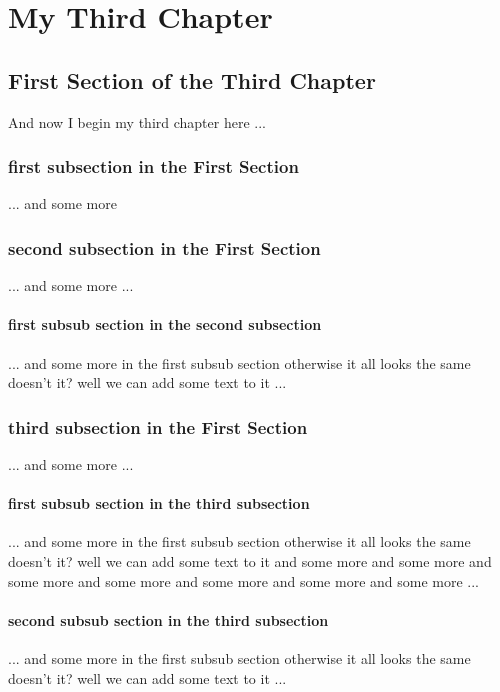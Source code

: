 \chapter{My Third Chapter}
\ifpdf
    \graphicspath{{Chapter3/Chapter3Figs/PNG/}{Chapter3/Chapter3Figs/PDF/}{Chapter3/Chapter3Figs/}}
\else
    \graphicspath{{Chapter3/Chapter3Figs/EPS/}{Chapter3/Chapter3Figs/}}
\fi

\section{First Section of the Third Chapter}
And now I begin my third chapter here ...

\subsection{first subsection in the First Section}
... and some more 

\subsection{second subsection in the First Section}
... and some more ...

\subsubsection{first subsub section in the second subsection}
... and some more in the first subsub section otherwise it all looks the same
doesn't it? well we can add some text to it ...

\subsection{third subsection in the First Section}
... and some more ...

\subsubsection{first subsub section in the third subsection}
... and some more in the first subsub section otherwise it all looks the same
doesn't it? well we can add some text to it and some more and some more and
some more and some more and some more and some more and some more ...

\subsubsection{second subsub section in the third subsection}
... and some more in the first subsub section otherwise it all looks the same
doesn't it? well we can add some text to it ...

